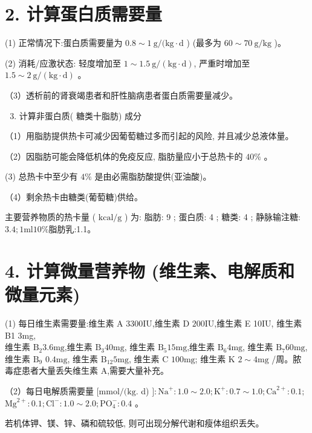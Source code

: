 \documentclass[10pt]{article}
\begin{document}
\section*{2. 计算蛋白质需要量}
(1) 正常情况下:蛋白质需要量为 $0.8 \sim 1 \mathrm{~g} /(\mathrm{kg} \cdot \mathrm{d}$ ) (最多为 $60 \sim 70 \mathrm{~g} / \mathrm{kg}$ )。

(2) 消耗/应激状态: 轻度增加至 $1 \sim 1.5 \mathrm{~g} /(\mathrm{kg} \cdot \mathrm{d})$, 严重时增加至 $1.5 \sim 2 \mathrm{~g} /(\mathrm{kg} \cdot \mathrm{d})$ 。

（3）透析前的肾衰竭患者和肝性脑病患者蛋白质需要量减少。

\begin{enumerate}
  \setcounter{enumi}{2}
  \item 计算非蛋白质( 糖类十脂肪) 成分
\end{enumerate}

（1）用脂肪提供热卡可减少因葡萄糖过多而引起的风险, 并且减少总液体量。

（2）因脂肪可能会降低机体的免疫反应, 脂肪量应小于总热卡的 $40 \%$ 。

(3) 总热卡中至少有 $4 \%$ 是由必需脂肪酸提供(亚油酸)。

（4）剩余热卡由糖类(葡萄糖)供给。

主要营养物质的热卡量 ( $\mathrm{kcal} / \mathrm{g}$ ) 为: 脂肪: 9 ; 蛋白质: 4 ; 糖类: 4 ; 静脉输注糖: $3.4 ; 1 \mathrm{ml} 10 \%$脂肪乳:1.1。

\section*{4. 计算微量营养物 (维生素、电解质和微量元素)}
(1) 每日维生素需要量:维生素 A 3300IU,维生素 D $200 \mathrm{IU}$,维生素 E 10IU, 维生素 B1 3mg,\\
维生素 $\mathrm{B}_{2} 3.6 \mathrm{mg}$,维生素 $\mathrm{B}_{3} 40 \mathrm{mg}$, 维生素 $\mathrm{B}_{5} 15 \mathrm{mg}$,维生素 $\mathrm{B}_{6} 4 \mathrm{mg}$, 维生素 $\mathrm{B}_{7} 60 \mathrm{mg}$, 维生素 $\mathrm{B}_{9}$ $0.4 \mathrm{mg}$, 维生素 $\mathrm{B}_{12} 5 \mathrm{mg}$, 维生素 C $100 \mathrm{mg}$; 维生素 K $2 \sim 4 \mathrm{mg}$ /周。脓毒症患者大量丢失维生素 A,需要大量补充。

（2）每日电解质需要量 $[\mathrm{mmol} /(\mathrm{kg}$. d) $]: \mathrm{Na}^{+}: 1.0 \sim 2.0 ; \mathrm{K}^{+}: 0.7 \sim 1.0 ; \mathrm{Ca}^{2+}: 0.1 ;$ $\mathrm{Mg}^{2+}: 0.1 ; \mathrm{Cl}^{-}: 1.0 \sim 2.0 ; \mathrm{PO}_{4}^{-}: 0.4$ 。

若机体钾、镁、锌、磷和硫较低, 则可出现分解代谢和瘦体组织丢失。
\end{document}
